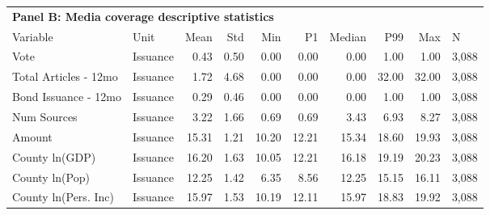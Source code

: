 \begin{table}[H]
\centering
\begin{tabular*}{\textwidth}{@{\extracolsep{\fill}}llrrrrrrrl}
\multicolumn{10}{l}{\textbf{Panel B: Media coverage descriptive statistics}}\\

\addlinespace
  \toprule
Variable & Unit & Mean & Std & Min & P1 & Median & P99 & Max & N \\ 
  \hline
Vote & Issuance & 0.43 & 0.50 & 0.00 & 0.00 & 0.00 & 1.00 & 1.00 & 3,088 \\ 
  Total Articles - 12mo & Issuance & 1.72 & 4.68 & 0.00 & 0.00 & 0.00 & 32.00 & 32.00 & 3,088 \\ 
  Bond Issuance - 12mo & Issuance & 0.29 & 0.46 & 0.00 & 0.00 & 0.00 & 1.00 & 1.00 & 3,088 \\ 
  Num Sources & Issuance & 3.22 & 1.66 & 0.69 & 0.69 & 3.43 & 6.93 & 8.27 & 3,088 \\ 
  Amount & Issuance & 15.31 & 1.21 & 10.20 & 12.21 & 15.34 & 18.60 & 19.93 & 3,088 \\ 
  County ln(GDP) & Issuance & 16.20 & 1.63 & 10.05 & 12.21 & 16.18 & 19.19 & 20.23 & 3,088 \\ 
  County ln(Pop) & Issuance & 12.25 & 1.42 & 6.35 & 8.56 & 12.25 & 15.15 & 16.11 & 3,088 \\ 
  County ln(Pers. Inc) & Issuance & 15.97 & 1.53 & 10.19 & 12.11 & 15.97 & 18.83 & 19.92 & 3,088 \\ 
   \hline
\end{tabular*}
\end{table}
